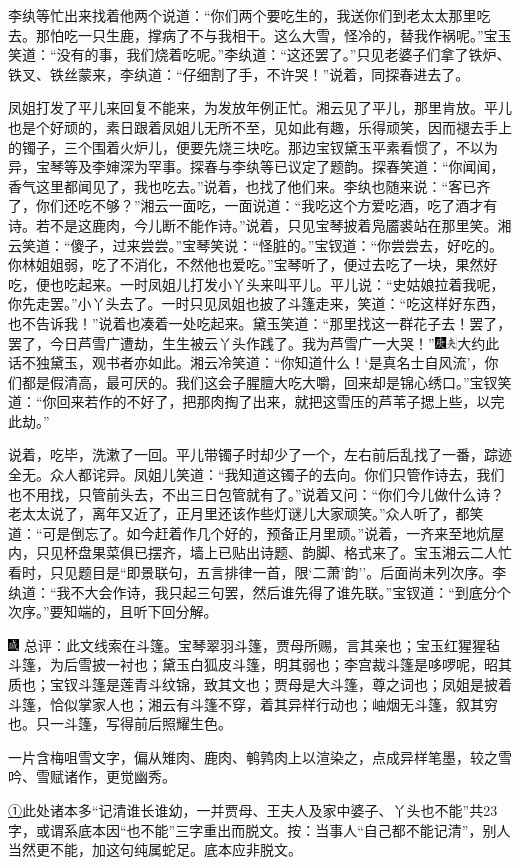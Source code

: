 李纨等忙出来找着他两个说道：``你们两个要吃生的，我送你们到老太太那里吃去。那怕吃一只生鹿，撑病了不与我相干。这么大雪，怪冷的，替我作祸呢。''宝玉笑道：``没有的事，我们烧着吃呢。''李纨道：``这还罢了。''只见老婆子们拿了铁炉、铁叉、铁丝蒙来，李纨道：``仔细割了手，不许哭！''说着，同探春进去了。

凤姐打发了平儿来回复不能来，为发放年例正忙。湘云见了平儿，那里肯放。平儿也是个好顽的，素日跟着凤姐儿无所不至，见如此有趣，乐得顽笑，因而褪去手上的镯子，三个围着火炉儿，便要先烧三块吃。那边宝钗黛玉平素看惯了，不以为异，宝琴等及李婶深为罕事。探春与李纨等已议定了题韵。探春笑道：``你闻闻，香气这里都闻见了，我也吃去。''说着，也找了他们来。李纨也随来说：``客已齐了，你们还吃不够？''湘云一面吃，一面说道：``我吃这个方爱吃酒，吃了酒才有诗。若不是这鹿肉，今儿断不能作诗。''说着，只见宝琴披着凫靥裘站在那里笑。湘云笑道：``傻子，过来尝尝。''宝琴笑说：``怪脏的。''宝钗道：``你尝尝去，好吃的。你林姐姐弱，吃了不消化，不然他也爱吃。''宝琴听了，便过去吃了一块，果然好吃，便也吃起来。一时凤姐儿打发小丫头来叫平儿。平儿说：``史姑娘拉着我呢，你先走罢。''小丫头去了。一时只见凤姐也披了斗篷走来，笑道：``吃这样好东西，也不告诉我！''说着也凑着一处吃起来。黛玉笑道：``那里找这一群花子去！罢了，罢了，今日芦雪广遭劫，生生被云丫头作践了。我为芦雪广一大哭！''{\includegraphics[width=3mm]{../Images/00004}\includegraphics[width=3mm]{../Images/00012}\footnotesize \kaishu 大约此话不独黛玉，观书者亦如此。}湘云冷笑道：``你知道什么！`是真名士自风流'，你们都是假清高，最可厌的。我们这会子腥膻大吃大嚼，回来却是锦心绣口。''宝钗笑道：``你回来若作的不好了，把那肉掏了出来，就把这雪压的芦苇子揌上些，以完此劫。''

说着，吃毕，洗漱了一回。平儿带镯子时却少了一个，左右前后乱找了一番，踪迹全无。众人都诧异。凤姐儿笑道：``我知道这镯子的去向。你们只管作诗去，我们也不用找，只管前头去，不出三日包管就有了。''说着又问：``你们今儿做什么诗？老太太说了，离年又近了，正月里还该作些灯谜儿大家顽笑。''众人听了，都笑道：``可是倒忘了。如今赶着作几个好的，预备正月里顽。''说着，一齐来至地炕屋内，只见杯盘果菜俱已摆齐，墙上已贴出诗题、韵脚、格式来了。宝玉湘云二人忙看时，只见题目是``即景联句，五言排律一首，限`二萧'韵''。后面尚未列次序。李纨道：``我不大会作诗，我只起三句罢，然后谁先得了谁先联。''宝钗道：``到底分个次序。''要知端的，且听下回分解。

{\includegraphics[width=3mm]{../Images/00005}  \kaishu 总评：此文线索在斗篷。宝琴翠羽斗篷，贾母所赐，言其亲也；宝玉红猩猩毡斗篷，为后雪披一衬也；黛玉白狐皮斗篷，明其弱也；李宫裁斗篷是哆啰呢，昭其质也；宝钗斗篷是莲青斗纹锦，致其文也；贾母是大斗篷，尊之词也；凤姐是披着斗篷，恰似掌家人也；湘云有斗篷不穿，着其异样行动也；岫烟无斗篷，叙其穷也。只一斗篷，写得前后照耀生色。}

{\kaishu 一片含梅咀雪文字，偏从雉肉、鹿肉、鹌鹑肉上以渲染之，点成异样笔墨，较之雪吟、雪赋诸作，更觉幽秀。}

{\href{../Text/part0053_split_000.html\#navto_1_a}{①}此处诸本多``记清谁长谁幼，一并贾母、王夫人及家中婆子、丫头也不能''共23字，或谓系底本因``也不能''三字重出而脱文。按：当事人``自己都不能记清''，别人当然更不能，加这句纯属蛇足。底本应非脱文。}
